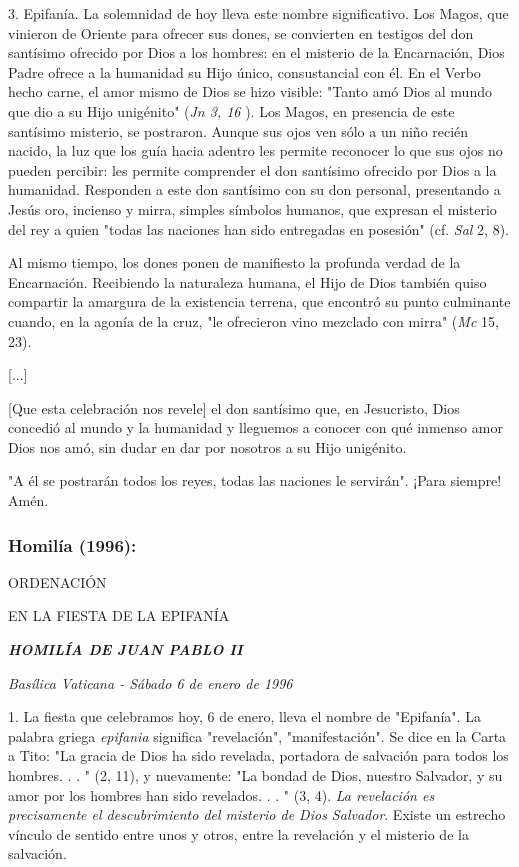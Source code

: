 3. Epifanía. La solemnidad de hoy lleva este nombre significativo. Los
Magos, que vinieron de Oriente para ofrecer sus dones, se convierten en
testigos del don santísimo ofrecido por Dios a los hombres: en el
misterio de la Encarnación, Dios Padre ofrece a la humanidad su Hijo
único, consustancial con él. En el Verbo hecho carne, el amor mismo de
Dios se hizo visible: "Tanto amó Dios al mundo que dio a su Hijo
unigénito" (\emph{Jn 3, 16} ). Los Magos, en presencia de este santísimo
misterio, se postraron. Aunque sus ojos ven sólo a un niño recién
nacido, la luz que los guía hacia adentro les permite reconocer lo que
sus ojos no pueden percibir: les permite comprender el don santísimo
ofrecido por Dios a la humanidad. Responden a este don santísimo con su
don personal, presentando a Jesús oro, incienso y mirra, simples
símbolos humanos, que expresan el misterio del rey a quien "todas las
naciones han sido entregadas en posesión" (cf. \emph{Sal} 2, 8).

Al mismo tiempo, los dones ponen de manifiesto la profunda verdad de la
Encarnación. Recibiendo la naturaleza humana, el Hijo de Dios también
quiso compartir la amargura de la existencia terrena, que encontró su
punto culminante cuando, en la agonía de la cruz, "le ofrecieron vino
mezclado con mirra" (\emph{Mc} 15, 23).

{[}...{]}

{[}Que esta celebración nos revele{]} el don santísimo que, en
Jesucristo, Dios concedió al mundo y la humanidad y lleguemos a conocer
con qué inmenso amor Dios nos amó, sin dudar en dar por nosotros a su
Hijo unigénito.

"A él se postrarán todos los reyes, todas las naciones le servirán".
¡Para siempre! Amén.

\subsubsection{Homilía (1996): }
ORDENACIÓN

EN LA FIESTA DE LA EPIFANÍA

\emph{\textbf{HOMILÍA DE JUAN PABLO II}}

\emph{Basílica Vaticana - Sábado 6 de enero de 1996}

1. La fiesta que celebramos hoy, 6 de enero, lleva el nombre de
"Epifanía". La palabra griega \emph{epifania} significa "revelación",
"manifestación". Se dice en la Carta a Tito: "La gracia de Dios ha sido
revelada, portadora de salvación para todos los hombres. . . " (2, 11),
y nuevamente: "La bondad de Dios, nuestro Salvador, y su amor por los
hombres han sido revelados. . . " (3, 4). \emph{La revelación es
	precisamente el descubrimiento del misterio de Dios Salvador}. Existe un
estrecho vínculo de sentido entre unos y otros, entre la revelación y el
misterio de la salvación.

